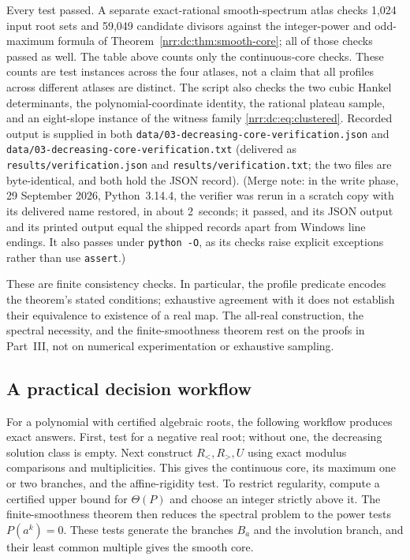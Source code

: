 \documentclass[11pt,letterpaper]{article}
\theoremstyle{definition}
\theoremstyle{remark}
\begin{document}
Every test passed. A separate exact-rational smooth-spectrum atlas checks
1,024 input root sets and 59,049 candidate divisors against the
integer-power and odd-maximum formula of
Theorem~\ref{nrr:dc:thm:smooth-core}; all of those checks passed as well. The
table above counts only the continuous-core checks. These counts are test
instances across the four atlases, not a claim that all profiles across
different atlases are distinct. The script also checks the two cubic Hankel
determinants, the polynomial-coordinate identity, the rational plateau sample,
and an eight-slope instance of the witness family
\eqref{nrr:dc:eq:clustered}. Recorded output is supplied in both
\nolinkurl{data/03-decreasing-core-verification.json} and
\nolinkurl{data/03-decreasing-core-verification.txt} (delivered as
\texttt{results/verification.json} and \texttt{results/verification.txt};
the two files are byte-identical, and both hold the JSON record). (Merge note:
in the write phase, 29 September 2026, Python~3.14.4, the verifier was rerun
in a scratch copy with its delivered name restored, in about 2~seconds; it
passed, and its JSON output and its printed output equal the shipped records
apart from Windows line endings. It also passes under \texttt{python -O}, as
its checks raise explicit exceptions rather than use \texttt{assert}.)

These are finite consistency checks. In particular, the profile
predicate encodes the theorem's stated conditions; exhaustive
agreement with it does not establish their equivalence to existence
of a real map. The all-real construction, the spectral necessity,
and the finite-smoothness theorem rest on the proofs in Part~III,
not on numerical experimentation or exhaustive sampling.

\subsection{A practical decision workflow}

For a polynomial with certified algebraic roots, the following workflow
produces exact answers.
First, test for a negative real root; without one, the decreasing
solution class is empty. Next construct $R_<,R_>,U$ using exact
modulus comparisons and multiplicities. This gives the continuous
core, its maximum one or two branches, and the affine-rigidity test.
To restrict regularity, compute a certified upper bound for $\Theta(P)$
and choose an integer strictly above it. The finite-smoothness theorem
then reduces the spectral problem to the power tests $P(a^k)=0$.
These tests generate the branches $B_a$ and the involution branch,
and their least common multiple gives the smooth core.
\end{document}
